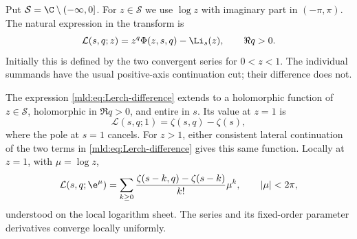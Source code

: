 Put $\mathcal S=\C\setminus(-\infty,0]$. For $z\in\mathcal S$ we use $\log z$ with imaginary part in $(-\pi,\pi)$. The natural expression in the transform is
\begin{equation}\label{mld:eq:Lerch-difference}
 \mathcal L(s,q;z)=z^q\Phi(z,s,q)-\Li_s(z),\qquad \Re q>0.
\end{equation}
Initially this is defined by the two convergent series for $0<z<1$. The individual summands have the usual positive-axis continuation cut; their difference does not.

\begin{lemma}\label{mld:lem:Lerch-cancellation}
The expression \eqref{mld:eq:Lerch-difference} extends to a holomorphic function of $z\in\mathcal S$, holomorphic in $\Re q>0$, and entire in $s$. Its value at $z=1$ is
\begin{equation}\label{mld:eq:Lerch-unit}
 \mathcal L(s,q;1)=\zeta(s,q)-\zeta(s),
\end{equation}
where the pole at $s=1$ cancels. For $z>1$, either consistent lateral continuation of the two terms in \eqref{mld:eq:Lerch-difference} gives this same function. Locally at $z=1$, with $\mu=\log z$,
\begin{equation}\label{mld:eq:Lerch-germ}
 \mathcal L(s,q;\e^\mu)
 =\sum_{k\ge0}\frac{\zeta(s-k,q)-\zeta(s-k)}{k!}\mu^k,
 \qquad |\mu|<2\pi,
\end{equation}
understood on the local logarithm sheet. The series and its fixed-order parameter derivatives converge locally uniformly.
\end{lemma}

